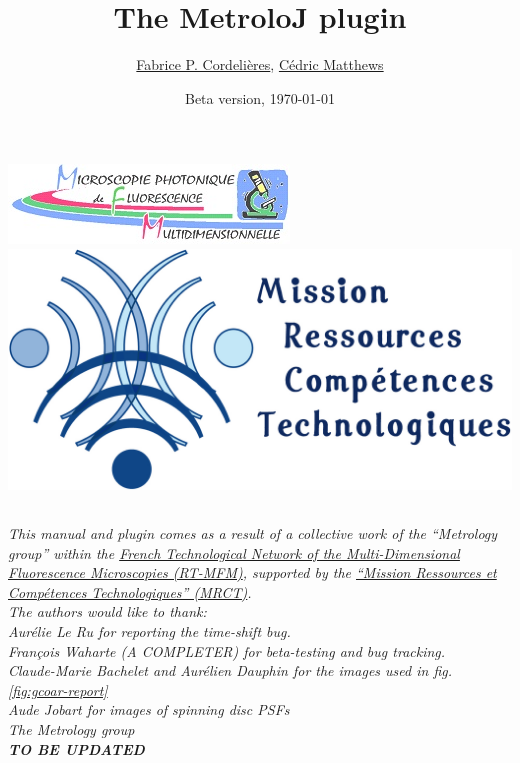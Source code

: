 \documentclass[a4paper, 11pt]{report}%
\title{
\textbf{The MetroloJ plugin}}
\author{\href{mailto:fabrice.cordelieres@gmail.com}{Fabrice P. Cordelières}, \href{mailto:cedric.matthews@ibdml.univ-mrs.fr }{Cédric Matthews}
\date{Beta version, \today}        %
}
\begin{document}
\begin{table}[!t]
	\begin {center}
			\includegraphics[width=0.35\linewidth]{img/logo_RT-MFM}  \hfill \includegraphics[width=0.25\linewidth]{img/logo_mrct}
	\end {center}
\end{table}

\maketitle

\newpage

\tableofcontents

\newpage

\begin{flushright}
\section*{}
\textit{This manual and plugin comes as a result of a collective work of the ``Metrology group'' within the \href{http://rtmfm.ibl.fr/}{French Technological Network of the Multi-Dimensional Fluorescence Microscopies (RT-MFM)}, supported by the \href{http://www.mrct.cnrs.fr/}{``Mission Ressources et Compétences Technologiques'' (MRCT)}.\\
\vspace{0.5cm}
The authors would like to thank:\\
Aurélie Le Ru for reporting the time-shift bug.\\
Fran\c cois Waharte (A COMPLETER) for beta-testing and bug tracking.\\
Claude-Marie Bachelet and Aurélien Dauphin for the images used in fig. \ref{fig:gcoar-report}\\
Aude Jobart for images of spinning disc PSFs\\
The Metrology group\\
\vspace{0.5cm}
\textbf{TO BE UPDATED}
}
\end{flushright}
\newpage

\end{document}
